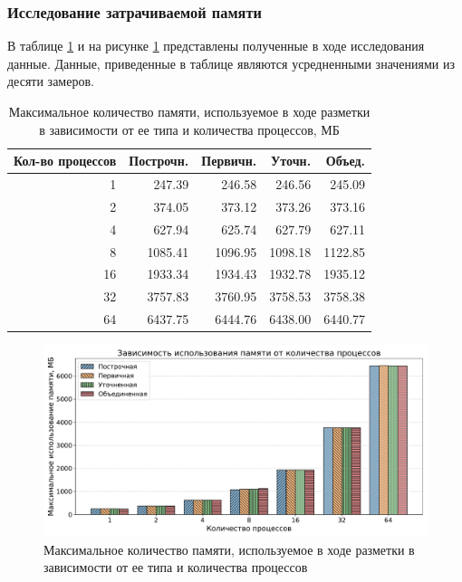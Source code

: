 \subsubsection{Исследование затрачиваемой памяти}

В таблице \ref{tab:pama} и на рисунке \ref{fig:pama} представлены полученные в ходе исследования данные.
Данные, приведенные в таблице являются усредненными значениями из десяти замеров.

\begin{table}[H]
    \centering
    \caption{Максимальное количество памяти, используемое в ходе разметки в зависимости от ее типа и количества процессов, МБ}
    \label{tab:pama}
    \begin{tabular}{|r|r|r|r|r|}
        \hline
        \textbf{Кол-во процессов} & \textbf{Построчн.} & \textbf{Первичн.} & \textbf{Уточн.} & \textbf{Объед.} \\ \hline
        1 & 247.39 & 246.58 & 246.56 & 245.09 \\ \hline
        2 & 374.05 & 373.12 & 373.26 & 373.16 \\ \hline
        4 & 627.94 & 625.74 & 627.79 & 627.11 \\ \hline
        8 & 1085.41 & 1096.95 & 1098.18 & 1122.85 \\ \hline
        16 & 1933.34 & 1934.43 & 1932.78 & 1935.12 \\ \hline
        32 & 3757.83 & 3760.95 & 3758.53 & 3758.38 \\ \hline
        64 & 6437.75 & 6444.76 & 6438.00 & 6440.77 \\ \hline
    \end{tabular}
\end{table}

\begin{figure}[H]
	\centering
	\includegraphics[width=\textwidth]{diag/pama_bar.pdf}
    \caption{Максимальное количество памяти, используемое в ходе разметки в зависимости от ее типа и количества процессов}
	\label{fig:pama}
\end{figure}

